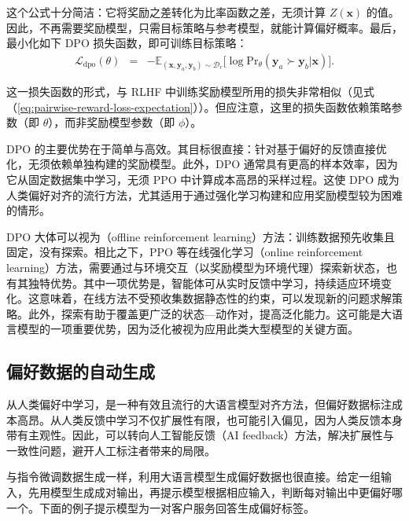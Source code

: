这个公式十分简洁：它将奖励之差转化为比率函数之差，无须计算 $Z(\mathbf{x})$ 的值。因此，不再需要奖励模型，只需目标策略与参考模型，就能计算偏好概率。最后，最小化如下 DPO 损失函数，即可训练目标策略：
\begin{eqnarray}
\mathcal{L}_{\mathrm{dpo}}(\theta) & = & -\mathbb{E}_{(\mathbf{x},\mathbf{y}_a,\mathbf{y}_b) \sim \mathcal{D}_r} \big[ \log \mathrm{Pr}_{\theta}(\mathbf{y}_a \succ \mathbf{y}_b | \mathbf{x}) \big].
\end{eqnarray}

\noindent 这一损失函数的形式，与 RLHF 中训练奖励模型所用的损失非常相似（见式（\ref{eq:pairwise-reward-loss-expectation}））。但应注意，这里的损失函数依赖策略参数（即 $\theta$），而非奖励模型参数（即 $\phi$）。

DPO 的主要优势在于简单与高效。其目标很直接：针对基于偏好的反馈直接优化，无须依赖单独构建的奖励模型。此外，DPO 通常具有更高的样本效率，因为它从固定数据集中学习，无须 PPO 中计算成本高昂的采样过程。这使 DPO 成为人类偏好对齐的流行方法，尤其适用于通过强化学习构建和应用奖励模型较为困难的情形。

DPO 大体可以视为（offline reinforcement learning）方法：训练数据预先收集且固定，没有探索。相比之下，PPO 等在线强化学习（online reinforcement learning）方法，需要通过与环境交互（以奖励模型为环境代理）探索新状态，也有其独特优势。其中一项优势是，智能体可从实时反馈中学习，持续适应环境变化。这意味着，在线方法不受预收集数据静态性的约束，可以发现新的问题求解策略。此外，探索有助于覆盖更广泛的状态—动作对，提高泛化能力。这可能是大语言模型的一项重要优势，因为泛化被视为应用此类大型模型的关键方面。

\subsection{偏好数据的自动生成}

\noindent 从人类偏好中学习，是一种有效且流行的大语言模型对齐方法，但偏好数据标注成本高昂。从人类反馈中学习不仅扩展性有限，也可能引入偏见，因为人类反馈本身带有主观性。因此，可以转向人工智能反馈（AI feedback）方法，解决扩展性与一致性问题，避开人工标注者带来的局限。

与指令微调数据生成一样，利用大语言模型生成偏好数据也很直接。给定一组输入，先用模型生成成对输出，再提示模型根据相应输入，判断每对输出中更偏好哪一个。下面的例子提示模型为一对客户服务回答生成偏好标签。

